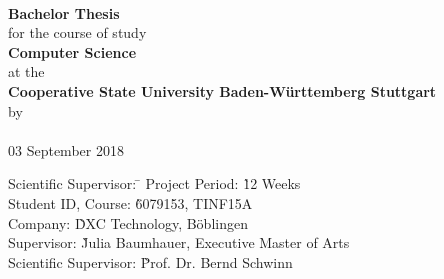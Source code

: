 \begin{titlepage}

\begin{minipage}{\textwidth}
		\vspace{-2cm}
		\noindent
		\hfill
\end{minipage}

\enlargethispage{20mm}

\sffamily
\begin{center}
    \vspace*{24mm}  {\large\textbf{\dertitel}}       \\
    \vspace*{12mm}  {\large\textbf{Bachelor Thesis}}        \\
    \vspace*{24mm}   for the course of study         \\
    \vspace*{3mm}   {\large\textbf{Computer Science}} \\
    \vspace*{3mm}   at the                         \\
    \vspace*{3mm}   {\large\textbf{Cooperative State University Baden-Württemberg Stuttgart}}  \\
    \vspace*{12mm}  by                              \\
    \vspace*{3mm}   {\large\textbf{\derautor}}      \\
    \vspace*{12mm}  03 September 2018 \\

\vfill

\begin{minipage}{\textwidth}

\begin{tabbing}
	Scientific Supervisor: \hspace{1.85cm} \= \kill
	Project Period: \` 12 Weeks \\[1.5mm]
	Student ID, Course: \` 6079153, TINF15A\\[1.5mm]
	Company: \` DXC Technology, Böblingen\\[1.5mm]
	Supervisor: \` Julia Baumhauer, Executive Master of Arts\\[1.5mm]
	Scientific Supervisor: \` Prof. Dr. Bernd Schwinn \\[1.5mm]

\end{tabbing}
\end{minipage}

\end{center}

\end{titlepage}
